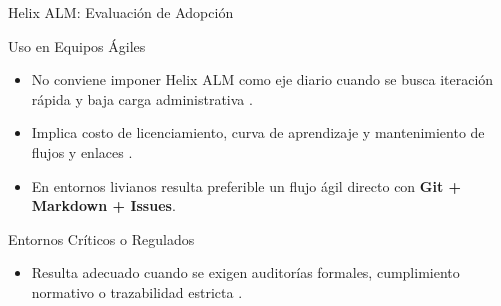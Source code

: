 
\begin{frame}{Helix ALM: Evaluaci\'on de Adopci\'on}
  \begin{block}{Uso en Equipos \'Agiles}
    \begin{itemize}
      \item No conviene imponer Helix ALM como eje diario cuando se busca iteraci\'on r\'apida y baja carga administrativa \cite{perforce2026web}.
      \item Implica costo de licenciamiento, curva de aprendizaje y mantenimiento de flujos y enlaces \cite{perforce2026web}.
      \item En entornos livianos resulta preferible un flujo \'agil directo con \textbf{Git + Markdown + Issues}.
    \end{itemize}
  \end{block}
  \vspace{0.2cm}
  \begin{alertblock}{Entornos Cr\'iticos o Regulados}
    \begin{itemize}
      \item Resulta adecuado cuando se exigen auditor\'ias formales, cumplimiento normativo o trazabilidad estricta \cite{perforce2026web}.
    \end{itemize}
  \end{alertblock}
\end{frame}

